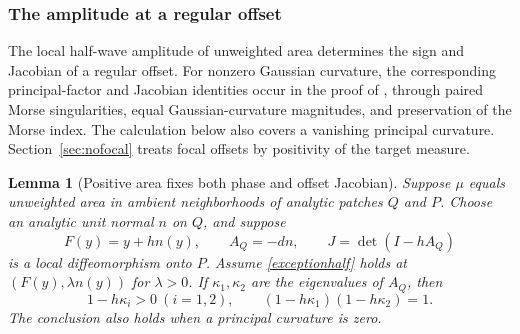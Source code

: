 \documentclass[11pt]{article}
\newtheorem{lemma}[theorem]{Lemma}
\begin{document}
\subsubsection{The amplitude at a regular offset}
The local half-wave amplitude of unweighted area determines the sign and Jacobian of a regular offset. For nonzero Gaussian curvature, the corresponding principal-factor and Jacobian identities occur in the proof of \cite[Lemma 6.2, pp.~11--12]{GHL}, through paired Morse singularities, equal Gaussian-curvature magnitudes, and preservation of the Morse index. The calculation below also covers a vanishing principal curvature. Section~\ref{sec:nofocal} treats focal offsets by positivity of the target measure.
\begin{lemma}[Positive area fixes both phase and offset Jacobian]\label{lem:offsetamplitude}
Suppose $\mu$ equals unweighted area in ambient neighborhoods of analytic patches $Q$ and $P$. Choose an analytic unit normal $n$ on $Q$, and suppose
\[
 F(y)=y+hn(y),\qquad A_Q=-dn,
 \qquad J=\det(I-hA_Q)
\]
is a local diffeomorphism onto $P$. Assume \eqref{exceptionhalf} holds at $(F(y),\lambda n(y))$ for $\lambda>0$. If $\kappa_1,\kappa_2$ are the eigenvalues of $A_Q$, then
\begin{equation}\label{positiveoffset}
 1-h\kappa_i>0\ (i=1,2),\qquad
 (1-h\kappa_1)(1-h\kappa_2)=1.
\end{equation}
The conclusion also holds when a principal curvature is zero.
\end{lemma}
\end{document}
